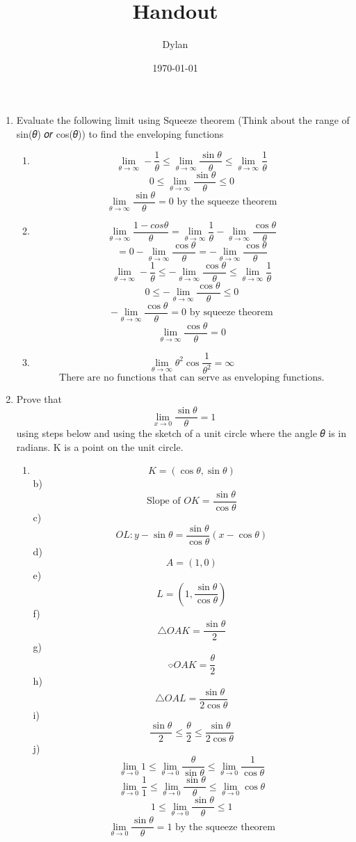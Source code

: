 \documentclass[letterpaper]{article}
\author{Dylan}
\date{\today}
\title{Handout}
\renewcommand{\tableofcontents}{}
\begin{document}
\tableofcontents

\begin{enumerate}
\item Evaluate the following limit using Squeeze theorem (Think about the
range of sin(𝜃) 𝑜𝑟 cos(𝜃)) to find the enveloping functions

\begin{enumerate}
\item \[\lim\limits_{\theta \to \infty}-\frac{1}{\theta}\leq\lim\limits_{\theta \to \infty}\frac{\sin{\theta}}{\theta}\leq\lim\limits_{\theta \to \infty}\frac{1}{\theta}\]\[0\leq\lim\limits_{\theta \to \infty}\frac{\sin{\theta}}{\theta}\leq0\]\[\lim\limits_{\theta \to \infty}\frac{\sin{\theta}}{\theta} = 0 \text{ by the squeeze theorem}\]
\item \[\lim\limits_{\theta \to \infty}\frac{1-cos{\theta}}{\theta}=\lim\limits_{\theta \to \infty}\frac{1}{\theta}-\lim\limits_{\theta \to \infty}\frac{\cos{\theta}}{\theta}\]\[=0-\lim\limits_{\theta \to \infty}\frac{\cos{\theta}}{\theta}
       =-\lim\limits_{\theta \to \infty}\frac{\cos{\theta}}{\theta}\]\[\lim\limits_{\theta \to \infty}-\frac{1}{\theta}\leq-\lim\limits_{\theta \to \infty}\frac{\cos{\theta}}{\theta}\leq\lim\limits_{\theta \to \infty}\frac{1}{\theta}\]\[0\leq-\lim\limits_{\theta \to \infty}\frac{\cos{\theta}}{\theta}\leq0\]\[-\lim\limits_{\theta \to \infty}\frac{\cos{\theta}}{\theta}=0 \text{ by squeeze theorem}\]\[\lim\limits_{\theta \to \infty}\frac{\cos{\theta}}{\theta}=0\]
\item \[\lim\limits_{\theta \to \infty}\theta^2\cos{\frac{1}{\theta^2}} = \infty\]\[\text{There are no functions that can serve as enveloping functions.}\]
\end{enumerate}

\item Prove that\[\lim\limits_{x\to0}\frac{\sin{\theta}}{\theta} = 1\]
using steps below and using the sketch of a unit circle where the
angle 𝜃 is in radians. K is a point on the unit circle.

\begin{enumerate}
\item \[K = (\cos{\theta}, \sin{\theta})\]b)
\[\text{Slope of }OK = \frac{\sin{\theta}}{\cos{\theta}}\]c)
\[OL: y-\sin{\theta}=\frac{\sin{\theta}}{\cos{\theta}}(x-\cos{\theta})\]d)
\[A=(1, 0)\]e) \[L=(1, \frac{\sin{\theta}}{\cos{\theta}})\]f)
\[\triangle OAK=\frac{\sin{\theta}}{2}\]g)
\[\text{⌔} OAK=\frac{\theta}{2}\]h)
\[\triangle OAL=\frac{\sin\theta}{2\cos\theta}\]i)
\[\frac{\sin{\theta}}{2}\leq\frac{\theta}{2}\leq\frac{\sin{\theta}}{2\cos{\theta}}\]j)
\[\lim_{\theta\to0}1\leq\lim_{\theta\to0}\frac{\theta}{\sin{\theta}}\leq\lim_{\theta\to0}\frac{1}{\cos{\theta}}\]\[\lim_{\theta\to0}\frac{1}{1}\leq\lim_{\theta\to0}\frac{\sin{\theta}}{\theta}\leq\lim_{\theta\to0}\cos{\theta}\]\[1\leq\lim_{\theta\to0}\frac{\sin{\theta}}{\theta}\leq1\]\[\lim_{\theta\to0}\frac{\sin{\theta}}{\theta}=1\text{ by the squeeze theorem}\]
\end{enumerate}
\end{enumerate}
\end{document}
